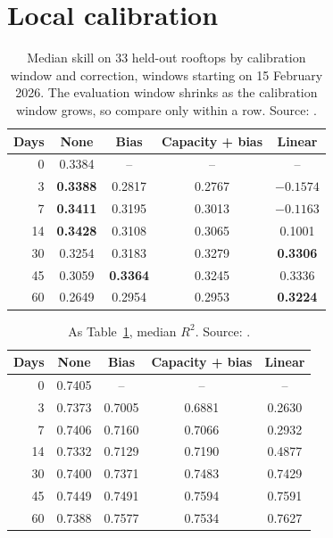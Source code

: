 \section{Local calibration}
\label{sec:s-calib}

\begin{table}[H]
\centering
\caption{Median skill on 33 held-out rooftops by calibration window and correction, windows starting on 15 February 2026. The evaluation window shrinks as the calibration window grows, so compare only within a row. Source: .}
\label{tab:s-calib-skill}
\small
\begin{tabular}{@{}r c c c c@{}}
\toprule
Days & None & Bias & Capacity + bias & Linear \\
\midrule
0 & 0.3384 & -- & -- & -- \\
3 & \textbf{0.3388} & 0.2817 & 0.2767 & $-0.1574$ \\
7 & \textbf{0.3411} & 0.3195 & 0.3013 & $-0.1163$ \\
14 & \textbf{0.3428} & 0.3108 & 0.3065 & 0.1001 \\
30 & 0.3254 & 0.3183 & 0.3279 & \textbf{0.3306} \\
45 & 0.3059 & \textbf{0.3364} & 0.3245 & 0.3336 \\
60 & 0.2649 & 0.2954 & 0.2953 & \textbf{0.3224} \\
\bottomrule
\end{tabular}
\end{table}

\begin{table}[H]
\centering
\caption{As Table~\ref{tab:s-calib-skill}, median $R^2$. Source: .}
\label{tab:s-calib-r2}
\small
\begin{tabular}{@{}r c c c c@{}}
\toprule
Days & None & Bias & Capacity + bias & Linear \\
\midrule
0 & 0.7405 & -- & -- & -- \\
3 & 0.7373 & 0.7005 & 0.6881 & 0.2630 \\
7 & 0.7406 & 0.7160 & 0.7066 & 0.2932 \\
14 & 0.7332 & 0.7129 & 0.7190 & 0.4877 \\
30 & 0.7400 & 0.7371 & 0.7483 & 0.7429 \\
45 & 0.7449 & 0.7491 & 0.7594 & 0.7591 \\
60 & 0.7388 & 0.7577 & 0.7534 & 0.7627 \\
\bottomrule
\end{tabular}
\end{table}

